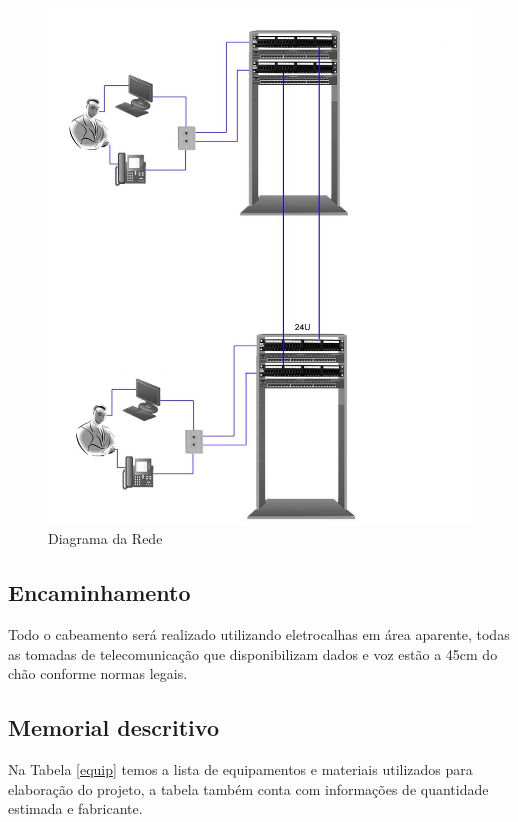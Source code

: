 \documentclass[	DIV=calc,%
							paper=a4,%
							fontsize=12pt,%
							onecolumn]{scrartcl}	 					%
\begin{document}
\begin{figure}
	\centering
	\includegraphics[width=\textwidth]{diagrama_logico}
	\caption{Diagrama da Rede}
	\label{diag_log}
\end{figure}
\FloatBarrier



\subsection{Encaminhamento}
Todo o cabeamento será realizado utilizando eletrocalhas em área aparente, todas as tomadas de telecomunicação que disponibilizam dados e voz estão a 45cm do chão conforme normas legais.

\subsection{Memorial descritivo}

Na Tabela \ref{equip} temos a lista de equipamentos e materiais utilizados para elaboração do projeto, a tabela também conta com informações de quantidade estimada e fabricante.
\end{document}
